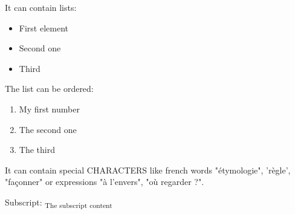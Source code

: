 \documentclass[letter,titlepage,oneside,11pt]{report}%
\begin{document}
\par%
\begin{FlushLeft}%
It can contain lists:%
\end{FlushLeft}%
\begin{itemize}%
\item First element%
\item Second one%
\item Third%
\end{itemize}%
\par%
\begin{FlushLeft}%
The list can be ordered:%
\end{FlushLeft}%
\begin{enumerate}%
\item My first number%
\item The second one%
\item The third%
\end{enumerate}%
\par%
\begin{FlushLeft}%
It can contain special CHARACTERS like french words "étymologie", 'règle', "façonner" or expressions "à l'envers", "où regarder ?".%
\end{FlushLeft}%
\par%
\begin{FlushLeft}%
Subscript: \textsubscript{The subscript content}%
\end{FlushLeft}%
\end{document}
